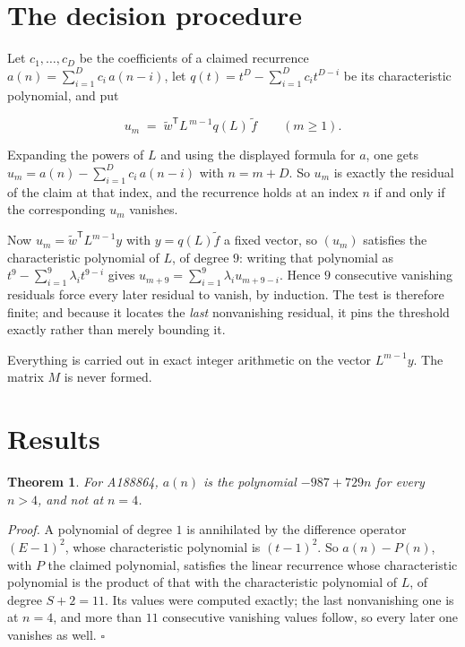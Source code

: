 \documentclass[11pt]{article}
\newtheorem{theorem}{Theorem}
\theoremstyle{definition}
\begin{document}
\section{The decision procedure}

Let $c_1,\dots,c_D$ be the coefficients of a claimed recurrence $a(n) = \sum_{i=1}^{D} c_i\,a(n-i)$, let $q(t) = t^{D} - \sum_{i=1}^{D} c_i t^{D-i}$ be its characteristic polynomial, and put

\[u_m \;=\; \tilde w^{\mathsf T} L^{\,m-1} q(L)\,\tilde f \qquad (m \ge 1).\]

Expanding the powers of $L$ and using the displayed formula for $a$, one gets $u_m = a(n) - \sum_{i=1}^{D} c_i\,a(n-i)$ with $n = m + D$. So $u_m$ is exactly the residual of the claim at that index, and the recurrence holds at an index $n$ if and only if the corresponding $u_m$ vanishes.

Now $u_m = \tilde w^{\mathsf T} L^{m-1} y$ with $y = q(L)\tilde f$ a fixed vector, so $(u_m)$ satisfies the characteristic polynomial of $L$, of degree $9$: writing that polynomial as $t^{9} - \sum_{i=1}^{9} \lambda_i t^{9-i}$ gives $u_{m+9} = \sum_{i=1}^{9} \lambda_i u_{m+9-i}$. Hence $9$ consecutive vanishing residuals force every later residual to vanish, by induction. The test is therefore finite; and because it locates the {\itshape last} nonvanishing residual, it pins the threshold exactly rather than merely bounding it.

Everything is carried out in exact integer arithmetic on the vector $L^{m-1}y$. The matrix $M$ is never formed.

\section{Results}

\begin{theorem} For A188864, $a(n)$ is the polynomial $-987 + 729n$ for every $n > 4$, and not at $n = 4$.\end{theorem}

{\itshape Proof.} A polynomial of degree $1$ is annihilated by the difference operator $(E-1)^{2}$, whose characteristic polynomial is $(t-1)^{2}$. So $a(n) - P(n)$, with $P$ the claimed polynomial, satisfies the linear recurrence whose characteristic polynomial is the product of that with the characteristic polynomial of $L$, of degree $S + 2 = 11$. Its values were computed exactly; the last nonvanishing one is at $n = 4$, and more than $11$ consecutive vanishing values follow, so every later one vanishes as well. $\square$
\end{document}
